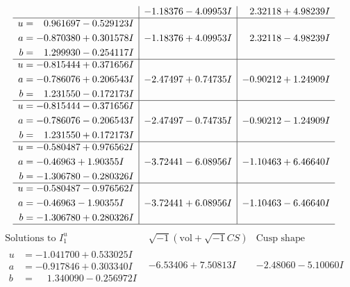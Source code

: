 \documentclass[1p]{elsarticle_modified}
\theoremstyle{definition}
\newcommand{\I}{\sqrt{-1}}
\begin{document}
$$\begin{array}{c|c|c}
 & -1.18376 - 4.09953 I & \phantom{-}2.32118 + 4.98239 I \\ \hline\begin{aligned}
u &= \phantom{-}0.961697 - 0.529123 I \\
a &= -0.870380 + 0.301578 I \\
b &= \phantom{-}1.299930 - 0.254117 I\end{aligned}
 & -1.18376 + 4.09953 I & \phantom{-}2.32118 - 4.98239 I \\ \hline\begin{aligned}
u &= -0.815444 + 0.371656 I \\
a &= -0.786076 + 0.206543 I \\
b &= \phantom{-}1.231550 - 0.172173 I\end{aligned}
 & -2.47497 + 0.74735 I & -0.90212 + 1.24909 I \\ \hline\begin{aligned}
u &= -0.815444 - 0.371656 I \\
a &= -0.786076 - 0.206543 I \\
b &= \phantom{-}1.231550 + 0.172173 I\end{aligned}
 & -2.47497 - 0.74735 I & -0.90212 - 1.24909 I \\ \hline\begin{aligned}
u &= -0.580487 + 0.976562 I \\
a &= -0.46963 + 1.90355 I \\
b &= -1.306780 - 0.280326 I\end{aligned}
 & -3.72441 - 6.08956 I & -1.10463 + 6.46640 I \\ \hline\begin{aligned}
u &= -0.580487 - 0.976562 I \\
a &= -0.46963 - 1.90355 I \\
b &= -1.306780 + 0.280326 I\end{aligned}
 & -3.72441 + 6.08956 I & -1.10463 - 6.46640 I\\
 \hline 
 \end{array}$$\newpage$$\begin{array}{c|c|c}  
\text{Solutions to }I^u_{1}& \I (\text{vol} + \sqrt{-1}CS) & \text{Cusp shape}\\
 \hline 
\begin{aligned}
u &= -1.041700 + 0.533025 I \\
a &= -0.917846 + 0.303340 I \\
b &= \phantom{-}1.340090 - 0.256972 I\end{aligned}
 & -6.53406 + 7.50813 I & -2.48060 - 5.10060 I \\ \hline\begin{aligned}

\end{aligned}
\end{array}$$
\end{document}
